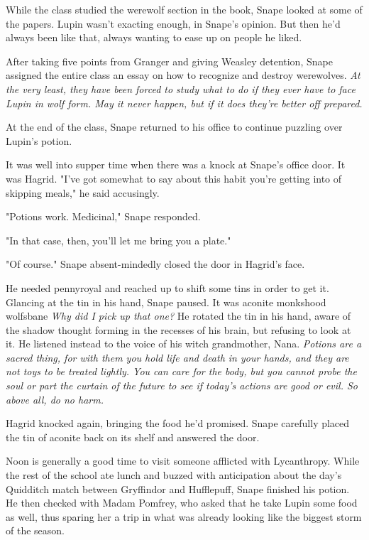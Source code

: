 While the class studied the werewolf section in the book, Snape looked at some of the papers. Lupin wasn't exacting enough, in Snape's opinion. But then he'd always been like that, always wanting to ease up on people he liked.

After taking five points from Granger and giving Weasley detention, Snape assigned the entire class an essay on how to recognize and destroy werewolves. \emph{At the very least, they have been forced to study what to do if they ever have to face Lupin in wolf form. May it never happen, but if it does they're better off prepared.}

At the end of the class, Snape returned to his office to continue puzzling over Lupin's potion.

It was well into supper time when there was a knock at Snape's office door. It was Hagrid. "I've got somewhat to say about this habit you're getting into of skipping meals," he said accusingly.

"Potions work. Medicinal," Snape responded.

"In that case, then, you'll let me bring you a plate."

"Of course." Snape absent-mindedly closed the door in Hagrid's face.

He needed pennyroyal and reached up to shift some tins in order to get it. Glancing at the tin in his hand, Snape paused. It was aconite{\el} monkshood{\el} wolfsbane{\el} \emph{Why did I pick up that one?} He rotated the tin in his hand, aware of the shadow thought forming in the recesses of his brain, but refusing to look at it. He listened instead to the voice of his witch grandmother, Nana. \emph{Potions are a sacred thing, for with them you hold life and death in your hands, and they are not toys to be treated lightly. You can care for the body, but you cannot probe the soul or part the curtain of the future to see if today's actions are good or evil. So above all, do no harm.}

Hagrid knocked again, bringing the food he'd promised. Snape carefully placed the tin of aconite back on its shelf and answered the door.

Noon is generally a good time to visit someone afflicted with Lycanthropy. While the rest of the school ate lunch and buzzed with anticipation about the day's Quidditch match between Gryffindor and Hufflepuff, Snape finished his potion. He then checked with Madam Pomfrey, who asked that he take Lupin some food as well, thus sparing her a trip in what was already looking like the biggest storm of the season.

